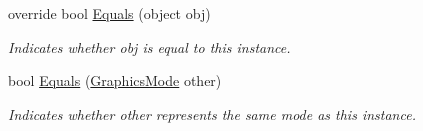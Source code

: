 \begin{DoxyCompactItemize}
override bool \hyperlink{class_open_t_k_1_1_graphics_1_1_graphics_mode_a4c2eabae157c94199d16cc3f4dae80ac}{Equals} (object obj)
\begin{DoxyCompactList}\small\item\em Indicates whether obj is equal to this instance. \end{DoxyCompactList}\item 
bool \hyperlink{class_open_t_k_1_1_graphics_1_1_graphics_mode_ad6351d57dcf7aabe6d27b1b82dfa6d39}{Equals} (\hyperlink{class_open_t_k_1_1_graphics_1_1_graphics_mode}{Graphics\-Mode} other)
\begin{DoxyCompactList}\small\item\em Indicates whether other represents the same mode as this instance. \end{DoxyCompactList}\end{DoxyCompactItemize}
